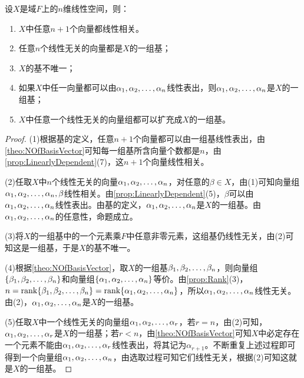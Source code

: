 \begin{property}\label{prop:nDimensionalLinearSpace}
	设$X$是域$F$上的$n$维线性空间，则：
	\begin{enumerate}
		\item $X$中任意$n+1$个向量都线性相关。
		\item 任意$n$个线性无关的向量都是$X$的一组基；
		\item $X$的基不唯一；
		\item 如果$X$中任一向量都可以由$\alpha_1, \alpha_2, \dots, \alpha_{n}$线性表出，则$\alpha_1, \alpha_2, \dots, \alpha_{n}$是$X$的一组基；
		\item $X$中任意一个线性无关的向量组都可以扩充成$X$的一组基。
	\end{enumerate}
\end{property}
\begin{proof}
	(1)根据基的定义，任意$n+1$个向量都可以由一组基线性表出，由\cref{theo:NOfBasisVector}可知每一组基所含向量个数都是$n$，由\cref{prop:LinearlyDependent}(7)，这$n+1$个向量线性相关。\par
	(2)任取$X$中$n$个线性无关的向量$\alpha_1, \alpha_2, \dots, \alpha_{n}$，对任意的$\beta\in X$，由(1)可知向量组$\alpha_1, \alpha_2, \dots, \alpha_{n},\beta$线性相关。由\cref{prop:LinearlyDependent}(5)，$\beta$可以由$\alpha_1, \alpha_2, \dots, \alpha_{n}$线性表出。由基的定义，$\alpha_1, \alpha_2, \dots, \alpha_{n}$是$X$的一组基。由$\alpha_1, \alpha_2, \dots, \alpha_{n}$的任意性，命题成立。\par
	(3)将$X$的一组基中的一个元素乘$F$中任意非零元素，这组基仍线性无关，由(2)可知这是一组基，于是$X$的基不唯一。\par
	(4)根据\cref{theo:NOfBasisVector}，取$X$的一组基$\beta_1, \beta_2, \dots, \beta_{n}$，则向量组$\{\beta_1, \beta_2, \dots, \beta_{n}\}$和向量组$\{\alpha_1, \alpha_2, \dots, \alpha_{n}\}$等价。由\cref{prop:Rank}(3)，$n=\operatorname{rank}\{\beta_1, \beta_2, \dots, \beta_{n}\}=\operatorname{rank}\{\alpha_1, \alpha_2, \dots, \alpha_{n}\}$，所以$\alpha_1, \alpha_2, \dots, \alpha_{n}$线性无关。由(2)，$\alpha_1, \alpha_2, \dots, \alpha_{n}$是$X$的一组基。\par
	(5)任取$X$中一个线性无关的向量组$\alpha_1, \alpha_2, \dots, \alpha_{r}$，若$r=n$，由(2)可知，$\alpha_1, \alpha_2, \dots, \alpha_{r}$是$X$的一组基；若$r<n$，由\cref{theo:NOfBasisVector}可知$X$中必定存在一个元素不能由$\alpha_1, \alpha_2, \dots, \alpha_{r}$线性表出，将其记为$\alpha_{r+1}$。不断重复上述过程即可得到一个向量组$\alpha_1, \alpha_2, \dots, \alpha_{n}$，由选取过程可知它们线性无关，根据(2)可知这就是$X$的一组基。
\end{proof}
